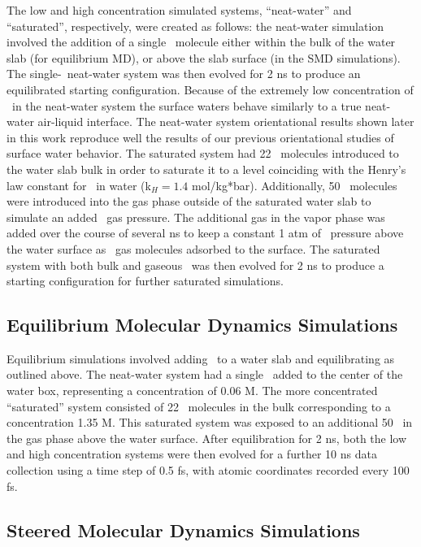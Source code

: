 \documentclass{article}
\begin{document}
The low and high concentration simulated systems, ``neat-water'' and ``saturated'', respectively, were created as follows: the neat-water simulation involved the addition of a single \suldiox~molecule either within the bulk of the water slab (for equilibrium MD), or above the slab surface (in the SMD simulations). The single-\suldiox~neat-water system was then evolved for 2 ns to produce an equilibrated starting configuration. Because of the extremely low concentration of \suldiox~in the neat-water system the surface waters behave similarly to a true neat-water air-liquid interface. The neat-water system orientational results shown later in this work reproduce well the results of our previous orientational studies of surface water behavior.\cite{Walker2006b,Hore2008} The saturated system had 22 \suldiox~molecules introduced to the water slab bulk in order to saturate it to a level coinciding with the Henry's law constant for \suldiox~in water (k\textdegree$_H = 1.4$ mol/kg*bar).\cite{Lide2000} Additionally, 50 \suldiox~molecules were introduced into the gas phase outside of the saturated water slab to simulate an added \suldiox~gas pressure. The additional gas in the vapor phase was added over the course of several ns to keep a constant 1 atm of \suldiox~pressure above the water surface as \suldiox~gas molecules adsorbed to the surface. The saturated system with both bulk and gaseous \suldiox~was then evolved for 2 ns to produce a starting configuration for further saturated simulations.

\subsection{Equilibrium Molecular Dynamics Simulations}

Equilibrium simulations involved adding \suldiox~to a water slab and equilibrating as outlined above. The neat-water system had a single \suldiox~added to the center of the water box, representing a concentration of 0.06 M. The more concentrated ``saturated'' system consisted of 22 \suldiox~molecules in the bulk corresponding to a concentration 1.35 M. This saturated system was exposed to an additional 50 \suldiox~in the gas phase above the water surface. After equilibration for 2 ns, both the low and high concentration systems were then evolved for a further 10 ns data collection using a time step of 0.5 fs, with atomic coordinates recorded every 100 fs.

\subsection{Steered Molecular Dynamics Simulations}
\end{document}
